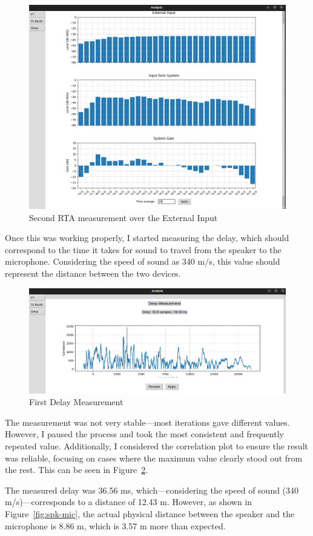 \begin{figure}[H]
	\centering
	\includegraphics[width=0.8
	\linewidth]{Figures/Coro_Pink_Good.png}
	\caption{Second RTA measurement over the External Input}
	\label{fig:Coro_Good_Pink}
\end{figure}

Once this was working properly, I started measuring the delay, which should correspond to the time it takes for sound to travel from the speaker to the microphone. Considering the speed of sound as 340 m/s, this value should represent the distance between the two devices.

\begin{figure}[H]
	\centering
	\includegraphics[width=0.8
	\linewidth]{Figures/Coro_Delay.png}
	\caption{First Delay Measurement}
	\label{fig:Coro_delay1}
\end{figure}

The measurement was not very stable—most iterations gave different values. However, I paused the process and took the most consistent and frequently repeated value. Additionally, I considered the correlation plot to ensure the result was reliable, focusing on cases where the maximum value clearly stood out from the rest. This can be seen in Figure~\ref{fig:Coro_delay1}. 

The measured delay was 36.56 ms, which—considering the speed of sound (340 m/s)—corresponds to a distance of 12.43 m. However, as shown in Figure~\ref{fig:spk-mic}, the actual physical distance between the speaker and the microphone is 8.86 m, which is 3.57 m more than expected.

